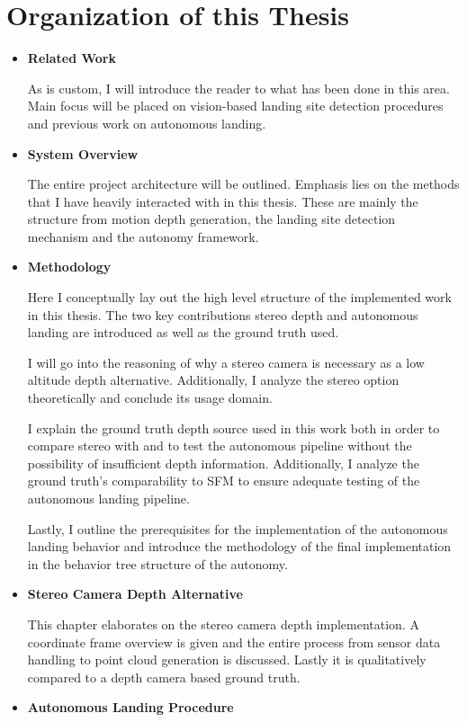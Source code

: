 \section{Organization of this Thesis}
\begin{itemize}
    \item \textbf{Related Work}

    As is custom, I will introduce the reader to what has been done in this area. Main focus will be placed on vision-based landing site detection procedures and previous work on autonomous landing. 
    \item \textbf{System Overview}

    The entire project architecture will be outlined. Emphasis lies on the methods that I have heavily interacted with in this thesis. These are mainly the structure from motion depth generation, the landing site detection mechanism and the autonomy framework.
    \item \textbf{Methodology}

    Here I conceptually lay out the high level structure of the implemented work in this thesis. The two key contributions stereo depth and autonomous landing are introduced as well as the ground truth used.

    I will go into the reasoning of why a stereo camera is necessary as a low altitude depth alternative. Additionally, I analyze the stereo option theoretically and conclude its usage domain.

    I explain the ground truth depth source used in this work both in order to compare stereo with and to test the autonomous pipeline without the possibility of insufficient depth information. Additionally, I analyze the ground truth's comparability to SFM to ensure adequate testing of the autonomous landing pipeline.

    Lastly, I outline the prerequisites for the implementation of the autonomous landing behavior and introduce the methodology of the final implementation in the behavior tree structure of the autonomy.

    \item \textbf{Stereo Camera Depth Alternative}

    This chapter elaborates on the stereo camera depth implementation. A coordinate frame overview is given and the entire process from sensor data handling to point cloud generation is discussed. Lastly it is qualitatively compared to a depth camera based ground truth.
    \item \textbf{Autonomous Landing Procedure}
    

\end{itemize}
